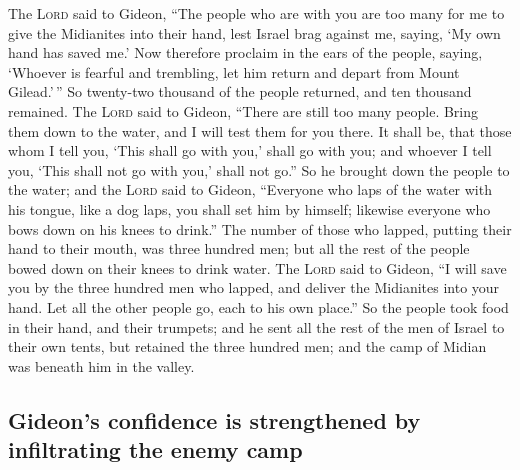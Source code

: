  The \textsc{Lord} said to Gideon, ``The people who are
with you are too many for me to give the Midianites into their hand,
lest Israel brag against me, saying, `My own hand has saved me.'
 Now therefore proclaim in the ears of the people, saying,
`Whoever is fearful and trembling, let him return and depart from Mount
Gilead.'\,'' So twenty-two thousand of the people returned, and ten
thousand remained.  The \textsc{Lord} said to Gideon,
``There are still too many people. Bring them down to the water, and I
will test them for you there. It shall be, that those whom I tell you,
`This shall go with you,' shall go with you; and whoever I tell you,
`This shall not go with you,' shall not go.''  So he
brought down the people to the water; and the \textsc{Lord} said to
Gideon, ``Everyone who laps of the water with his tongue, like a dog
laps, you shall set him by himself; likewise everyone who bows down on
his knees to drink.''  The number of those who lapped,
putting their hand to their mouth, was three hundred men; but all the
rest of the people bowed down on their knees to drink water.
 The \textsc{Lord} said to Gideon, ``I will save you by
the three hundred men who lapped, and deliver the Midianites into your
hand. Let all the other people go, each to his own place.''
 So the people took food in their hand, and their
trumpets; and he sent all the rest of the men of Israel to their own
tents, but retained the three hundred men; and the camp of Midian was
beneath him in the valley.

\hypertarget{gideons-confidence-is-strengthened-by-infiltrating-the-enemy-camp}{%
\subsection{Gideon's confidence is strengthened by infiltrating the
enemy
camp}\label{gideons-confidence-is-strengthened-by-infiltrating-the-enemy-camp}}

